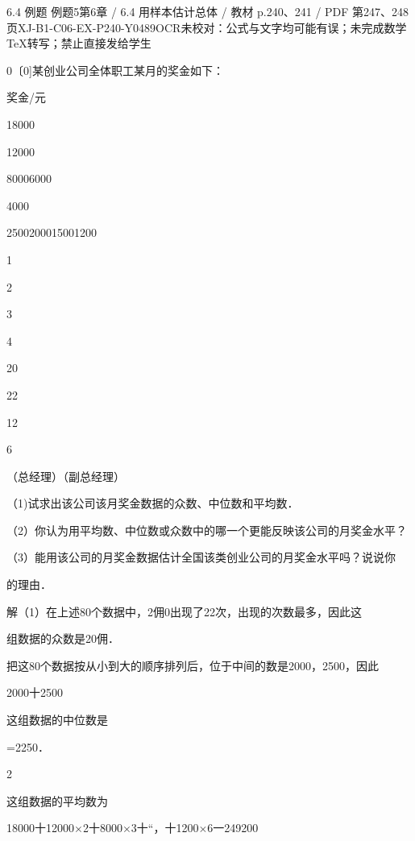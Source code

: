\begin{bankitem}{6.4 例题 例题5}{第6章 / 6.4 用样本估计总体 / 教材 p.240、241 / PDF 第247、248页}{XJ-B1-C06-EX-P240-Y0489}{OCR未校对：公式与文字均可能有误；未完成数学TeX转写；禁止直接发给学生}
\begin{ocrdraft}
\par
0〔0]某创业公司全体职工某月的奖金如下：
\par
奖金/元
\par
18000
\par
12000
\par
80006000
\par
4000
\par
2500200015001200
\par
1
\par
2
\par
3
\par
4
\par
20
\par
22
\par
12
\par
6
\par
（总经理）（副总经理）
\par
（1)试求出该公司该月奖金数据的众数、中位数和平均数．
\par
（2）你认为用平均数、中位数或众数中的哪一个更能反映该公司的月奖金水平？
\par
（3）能用该公司的月奖金数据估计全国该类创业公司的月奖金水平吗？说说你
\par
的理由．
\par
解（1）在上述80个数据中，2佣0出现了22次，出现的次数最多，因此这
\par
组数据的众数是20佣．
\par
把这80个数据按从小到大的顺序排列后，位于中间的数是2000，2500，因此
\par
2000十2500
\par
这组数据的中位数是
\par
=2250．
\par
2
\par
这组数据的平均数为
\par
18000十12000\ensuremath{\times}2十8000\ensuremath{\times}3十“，十1200\ensuremath{\times}6一249200

\end{ocrdraft}
\end{bankitem}
